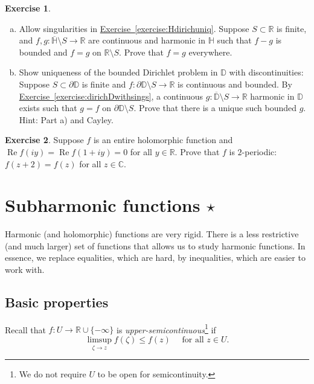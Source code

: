 \documentclass[12pt,openany]{book}
\renewcommand{\Re}{\operatorname{Re}}
\newcommand{\C}{{\mathbb{C}}}
\newcommand{\R}{{\mathbb{R}}}
\newcommand{\D}{{\mathbb{D}}}
\newcommand{\bH}{{\mathbb{H}}}
\newcommand{\myindex}[1]{#1\index{#1}}
\theoremstyle{plain}
\theoremstyle{remark}
\theoremstyle{definition}
\newenvironment{exbox}{%
    \def\FrameCommand{\vrule width 1pt \relax\hspace{10pt}}%
    \MakeFramed{\advance\hsize-\width\FrameRestore}%
}{%
    \endMakeFramed
}
\newenvironment{exparts}{%
    \leavevmode\begin{enumerate}[a),noitemsep,topsep=0pt,parsep=0pt,partopsep=0pt]
}{%
    \end{enumerate}
}
\theoremstyle{exercise}
\newtheorem{exercise}{Exercise}[section]
\theoremstyle{example}
\newcommand{\exerciseref}[1]{\hyperref[#1]{Exercise~\ref*{#1}}}
\begin{document}
\begin{exbox}
\begin{exercise}
\begin{exparts}
\item
Allow singularities in \exerciseref{exercise:Hdirichuniq}.
Suppose $S \subset \R$ is finite, and
$f,g \colon \overline{\bH} \setminus S \to \R$ are 
continuous and harmonic in $\bH$ such that $f-g$ is bounded and
$f=g$ on $\R \setminus S$.  Prove that $f=g$ everywhere.
\item
Show uniqueness of the bounded Dirichlet problem in $\D$ with
discontinuities:  Suppose $S \subset \partial \D$ is finite and
$f \colon \partial \D \setminus S \to \R$ is continuous and bounded.
By \exerciseref{exercise:dirichDwithsings}, a continuous $g \colon
\overline{\D} \setminus S \to \R$ harmonic in $\D$ exists such that $g=f$ on
$\partial \D \setminus S$.  Prove that there is a unique such bounded $g$.
Hint: Part a) and Cayley.
\end{exparts}
\end{exercise}

\begin{exercise}
Suppose $f$ is an entire holomorphic function and
$\Re f(iy) = \Re f(1+iy) = 0$ for all $y \in \R$.  Prove
that $f$ is $2$-periodic: $f(z+2)=f(z)$ for all $z \in \C$.
\end{exercise}
\end{exbox}



\section{Subharmonic functions \texorpdfstring{$\star$}{*}}
\label{sec:subharmonic}

Harmonic (and holomorphic) functions are very rigid.
There is a less restrictive (and much larger) set of functions that allows
us to study harmonic functions.  In essence, we replace equalities, which are
hard, by inequalities, which are easier to work with.

\subsection{Basic properties}

Recall that $f \colon U \to \R \cup \{ -\infty \}$
is \emph{\myindex{upper-semicontinuous}}\footnote{%
We do not require $U$ to be open for semicontinuity.}
if 
\begin{equation*}
\limsup_{\zeta \to z} f(\zeta) \leq f(z) \quad \text{ for all } z \in U.
\end{equation*}
\end{document}
